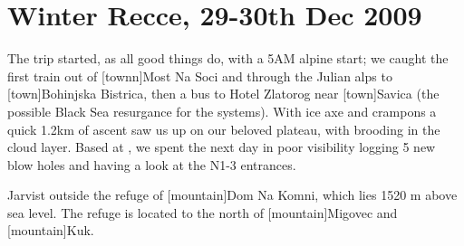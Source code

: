 \section{Winter Recce, 29-30th Dec 2009}

The trip started, as all good things do, with a 5AM alpine start; we caught the first train out of [townn]{Most Na Soci} and through the Julian alps to [town]{Bohinjska Bistrica}, then a bus to Hotel Zlatorog near [town]{Savica} (the possible Black Sea resurgance for the  systems). With ice axe and crampons a quick 1.2km of ascent saw us up on our beloved plateau, with  brooding in the cloud layer. Based at , we spent the next day in poor visibility logging 5 new blow holes and having a look at the N1-3 entrances.



\begin{pagefigure}
\checkoddpage \ifoddpage \forcerectofloat \else \forceversofloat \fi
{}
\caption{Jarvist outside the refuge of [mountain]Dom Na Komni, which lies 1520 m above sea level. The refuge is located to the north of  [mountain]Migovec and [mountain]Kuk. } \label{Dom Na Komni in snow}
\end{pagefigure}




